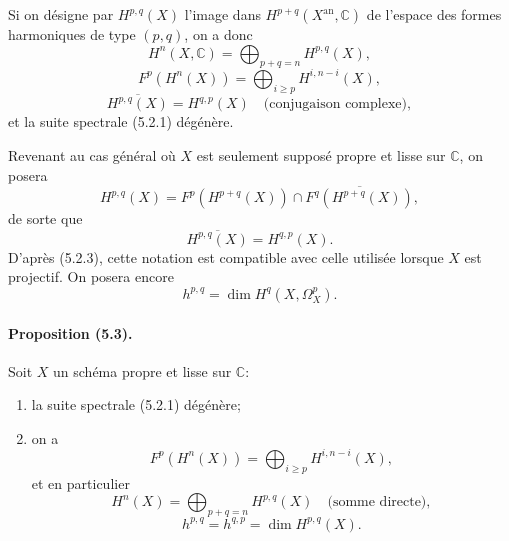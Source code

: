 \documentclass[10pt]{article}
\providecommand{\C}{\mathbb C}
\providecommand{\an}{\mathrm{an}}
\begin{document}
Si on désigne par $H^{p,q}(X)$ l'image dans $H^{p+q}(X^{\an},\C)$ de l'espace des formes harmoniques de type $(p,q)$, on a donc
\[
\tag{5.2.2}
H^n(X,\C)=\bigoplus_{p+q=n}H^{p,q}(X),
\]
\[
\tag{5.2.3}
F^p(H^n(X))=\bigoplus_{i\ge p}H^{i,n-i}(X),
\]
\[
\tag{5.2.4}
\overline{H^{p,q}(X)}=H^{q,p}(X)
\quad\text{(conjugaison complexe)},
\]
et la suite spectrale (5.2.1) dégénère.

Revenant au cas général où $X$ est seulement supposé propre et lisse sur $\C$, on posera
\[
\tag{5.2.5}
H^{p,q}(X)=F^p(H^{p+q}(X))\cap\overline{F^q(H^{p+q}(X))},
\]
de sorte que
\[
\tag{5.2.6}
\overline{H^{p,q}(X)}=H^{q,p}(X).
\]
D'après (5.2.3), cette notation est compatible avec celle utilisée lorsque $X$ est projectif. On posera encore
\[
\tag{5.2.7}
h^{p,q}=\dim H^q(X,\Omega_X^p).
\]

\paragraph{Proposition (5.3).} Soit $X$ un schéma propre et lisse sur $\C$:
\begin{enumerate}[label=(\roman*)]
\item la suite spectrale (5.2.1) dégénère;
\item on a
\[
\tag{5.3.1}
F^p(H^n(X))=\bigoplus_{i\ge p}H^{i,n-i}(X),
\]
et en particulier
\[
\tag{5.3.2}
H^n(X)=\bigoplus_{p+q=n}H^{p,q}(X)
\quad\text{(somme directe)},
\]
\[
\tag{5.3.3}
h^{p,q}=h^{q,p}=\dim H^{p,q}(X).
\]
\end{enumerate}
\end{document}
